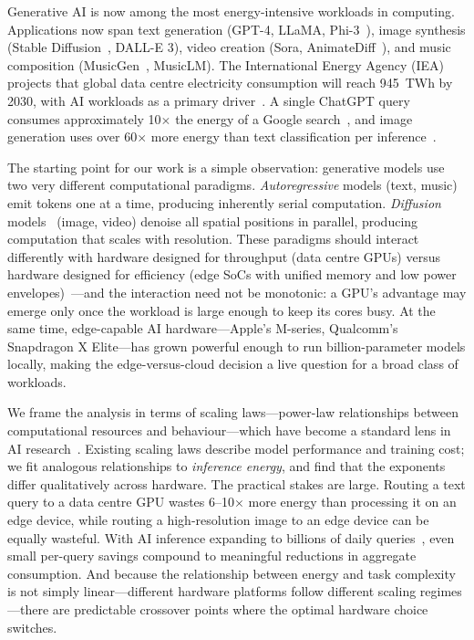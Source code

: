 \documentclass[preprint,12pt]{elsarticle}
\begin{document}
Generative AI is now among the most energy-intensive workloads in computing. Applications now span text generation (GPT-4, LLaMA, Phi-3~\cite{abdin2024phi3}), image synthesis (Stable Diffusion~\cite{rombach2022high}, DALL-E 3), video creation (Sora, AnimateDiff~\cite{guo2024animatediff}), and music composition (MusicGen~\cite{copet2024musicgen}, MusicLM). The International Energy Agency (IEA) projects that global data centre electricity consumption will reach 945~TWh by 2030, with AI workloads as a primary driver~\cite{iea2024}. A single ChatGPT query consumes approximately 10$\times$ the energy of a Google search~\cite{devries2023growing}, and image generation uses over 60$\times$ more energy than text classification per inference~\cite{luccioni2024power}.

The starting point for our work is a simple observation: generative models use two very different computational paradigms. \textit{Autoregressive} models (text, music) emit tokens one at a time, producing inherently serial computation. \textit{Diffusion} models~\cite{rombach2022high} (image, video) denoise all spatial positions in parallel, producing computation that scales with resolution. These paradigms should interact differently with hardware designed for throughput (data centre GPUs) versus hardware designed for efficiency (edge SoCs with unified memory and low power envelopes)~\cite{mao2024green}---and the interaction need not be monotonic: a GPU's advantage may emerge only once the workload is large enough to keep its cores busy. At the same time, edge-capable AI hardware---Apple's M-series, Qualcomm's Snapdragon X Elite---has grown powerful enough to run billion-parameter models locally, making the edge-versus-cloud decision a live question for a broad class of workloads.

We frame the analysis in terms of scaling laws---power-law relationships between computational resources and behaviour---which have become a standard lens in AI research~\cite{kaplan2020scaling}. Existing scaling laws describe model performance and training cost; we fit analogous relationships to \textit{inference energy}, and find that the exponents differ qualitatively across hardware. The practical stakes are large. Routing a text query to a data centre GPU wastes 6--10$\times$ more energy than processing it on an edge device, while routing a high-resolution image to an edge device can be equally wasteful. With AI inference expanding to billions of daily queries~\cite{devries2023growing}, even small per-query savings compound to meaningful reductions in aggregate consumption. And because the relationship between energy and task complexity is not simply linear---different hardware platforms follow different scaling regimes---there are predictable crossover points where the optimal hardware choice switches.
\end{document}
